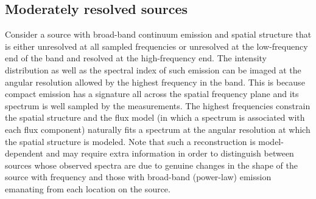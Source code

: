 \documentclass[structabstract]{stylefiles/aa}
\begin{document}
\subsection{Moderately resolved sources}

Consider a source with broad-band continuum emission and  
spatial structure that is either unresolved at all sampled frequencies
or unresolved at the low-frequency end of the band and resolved
at the high-frequency end. The intensity distribution as well as
the spectral index of such emission can be imaged
at the angular resolution allowed by the highest frequency in the band.
This is because compact emission has a signature all across the spatial frequency plane
and its spectrum is well sampled by the measurements. The highest frequencies constrain
the spatial structure and the flux model (in which a spectrum is associated with each
flux component) naturally fits a spectrum at the angular resolution at which the spatial 
structure is modeled. 
Note that such a reconstruction is model-dependent and may require extra information
in order to distinguish between sources whose observed spectra are due to genuine 
changes in the shape of the source with frequency and those with broad-band (power-law)
emission emanating from each location on the source.
\end{document}
